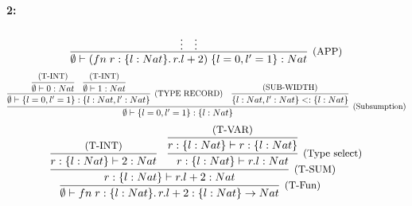 \paragraph*{2:}
\[
	\infer[\text{\small{(APP)}}]
	{\emptyset \vdash \APP{(\FN{r:\TREC{l: Nat}}{\SEL{r}{l}+2})}{\REC{l=0, l'=1}}: Nat}
	{ \vdots & \vdots }
\]
\[
  \infer[\text{\small{(Subsumption)}}]
	{\emptyset \vdash \REC{l=0, l'=1}: \TREC{l: Nat}}
  {
    \infer[\text{\small{(TYPE RECORD)}}]
    {\emptyset \vdash \REC{l=0, l'=1}: \TREC{l: Nat, l': Nat}}
    {
      \infer{\emptyset \vdash 0: Nat}{\text{\small{(T-INT)}}} &
      \infer{\emptyset \vdash 1: Nat}{\text{\small{(T-INT)}}}
    } &
    \infer
    {\TREC{l: Nat, l': Nat} <: \TREC{l: Nat}}
    {\text{\small{(SUB-WIDTH)}}}
  }
\]
\begin{align*}
  \infer[\text{\small{(T-Fun)}}]
  {\emptyset \vdash \FN{r:\TREC{l: Nat}}{\SEL{r}{l}+2}: \TREC{l: Nat} \to Nat}
  {
    \infer[\text{\small{(T-SUM)}}]
    { r:\TREC{l: Nat} \vdash \SEL{r}{l}+2: Nat }
    {
      \infer{r:\TREC{l: Nat} \vdash 2: Nat}{\text{\small{(T-INT)}}} &
      \infer[\text{\small{(Type select)}}]
      { r:\TREC{l: Nat} \vdash \SEL{r}{l}: Nat }
      {
        \infer
        {r:\TREC{l: Nat} \vdash r:\TREC{l: Nat}}
        {\text{\small{(T-VAR)}}}
      }
    }
  }
\end{align*}
